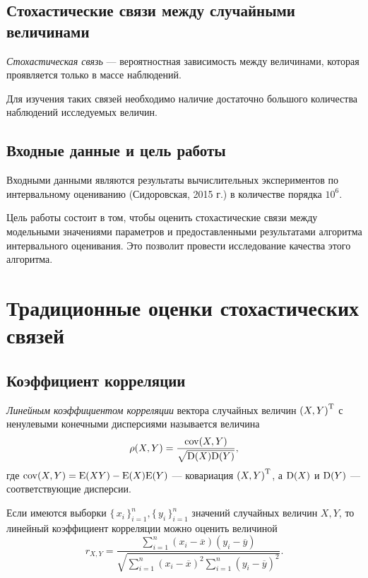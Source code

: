 \subsection*{Стохастические связи между случайными величинами}

\begin{define}
\emph{Стохастическая связь} --- вероятностная зависимость между величинами, которая проявляется только в массе наблюдений.
\end{define}

Для изучения таких связей необходимо наличие достаточно большого количества наблюдений исследуемых величин.

\subsection*{Входные данные и цель работы}

Входными данными являются результаты вычислительных экспериментов по интервальному оцениванию (Сидоровская, 2015 г.) в количестве порядка $10^6$.

Цель работы состоит в том, чтобы оценить стохастические связи между модельными значениями параметров и предоставленными результатами алгоритма интервального оценивания. Это позволит провести исследование качества этого алгоритма.

\section*{Традиционные оценки стохастических связей}
\subsection*{Коэффициент корреляции}

\begin{define}
\emph{Линейным коэффициентом корреляции} вектора случайных величин ${(X, Y)}^\mathrm{T}$ с ненулевыми конечными дисперсиями называется величина
\begin{equation}
	\rho(X, Y) = \frac{\mathrm{cov}(X, Y)}{\sqrt{\mathrm{D}(X)\mathrm{D}(Y)}},
\end{equation}
где $\mathrm{cov}(X, Y) = \mathrm{E}(XY) - \mathrm{E}(X)\mathrm{E}(Y)$ --- ковариация ${(X, Y)}^\mathrm{T}$, а $\mathrm{D}(X)$ и $\mathrm{D}(Y)$ --- соответствующие дисперсии.
\end{define}

Если имеются выборки $\{\, x_i \,\}_{i=1}^n, \{\, y_i \,\}_{i=1}^n$ значений случайных величин $X, Y$, то линейный коэффициент корреляции можно оценить величиной
\begin{equation}
r_{X, Y} = \frac{\sum_{i=1}^{n} (x_i - \overline{x})(y_i - \overline{y})}{\sqrt{\sum_{i=1}^{n} (x_i - \overline{x})^2 \sum_{i=1}^{n} (y_i - \overline{y})^2}}.
\end{equation}

